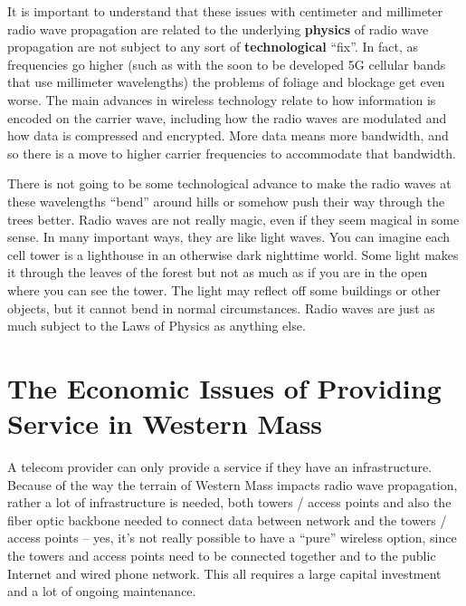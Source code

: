 \documentclass[12pt]{article}
\begin{document}
It is important to understand that these issues with centimeter and millimeter
radio wave propagation are related to the underlying \textbf{physics} of radio
wave propagation are not subject to any sort of \textbf{technological}
``fix''. In fact, as frequencies go higher (such as with the soon to be
developed 5G cellular bands that use millimeter wavelengths) the problems of
foliage and blockage get even worse. The main advances in wireless technology
relate to how information is encoded on the carrier wave, including how the
radio waves are modulated and how data is compressed and encrypted. More data
means more bandwidth, and so there is a move to higher carrier frequencies to
accommodate that bandwidth.

There is not going to be some technological advance to make the radio waves at
these wavelengths ``bend'' around hills or somehow push their way through the
trees better. Radio waves are not really magic, even if they seem magical in
some sense. In many important ways, they are like light waves. You can imagine
each cell tower is a lighthouse in an otherwise dark nighttime world. Some
light makes it through the leaves of the forest but not as much as if you are
in the open where you can see the tower. The light may reflect off some
buildings or other objects, but it cannot bend in normal circumstances. Radio
waves are just as much subject to the Laws of Physics as anything else.

\section{The Economic Issues of Providing Service in Western Mass}

A telecom provider can only provide a service if they have an infrastructure.
Because of the way the terrain of Western Mass impacts radio wave propagation,
rather a lot of infrastructure is needed, both towers / access points and also
the fiber optic backbone needed to connect data between network and the towers
/ access points -- yes, it's not really possible to have a ``pure'' wireless
option, since the towers and access points need to be connected together and
to the public Internet and wired phone network. This all requires a large
capital investment and a lot of ongoing maintenance. 
\end{document}
